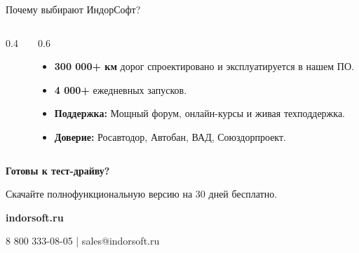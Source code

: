 \documentclass[aspectratio=169]{beamer}
\begin{document}
\begin{frame}{Почему выбирают ИндорСофт?}
    \begin{columns}
        \begin{column}{0.4\textwidth}
        \end{column}
        \begin{column}{0.6\textwidth}
            \begin{itemize}
                \item \textbf{\textcolor{VibrantOrange}{300 000+ км}} дорог спроектировано и эксплуатируется в нашем ПО.
                \item \textbf{\textcolor{NeonCyan}{4 000+}} ежедневных запусков.
                \item \textbf{Поддержка:} Мощный форум, онлайн-курсы и живая техподдержка.
                \item \textbf{Доверие:} Росавтодор, Автобан, ВАД, Союздорпроект.
            \end{itemize}
        \end{column}
    \end{columns}
\end{frame}

{
\begin{frame}[plain]
    \begin{center}
        \vspace{2cm}
        \Huge \textbf{Готовы к тест-драйву?}
        
        \vspace{0.5cm}
        \Large Скачайте полнофункциональную версию на 30 дней бесплатно.
        
        \vspace{1cm}
        \textbf{indorsoft.ru}
        
        \normalsize 8 800 333-08-05 | sales@indorsoft.ru
    \end{center}
\end{frame}
}
\end{document}
